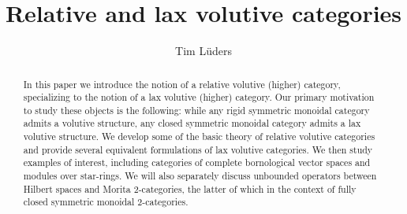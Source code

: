 \documentclass{article}
\title{Relative and lax volutive categories}
\author{Tim Lüders}
\date{}
\numberwithin{equation}{section}
\theoremstyle{definition}
\theoremstyle{theorem}
\begin{document}
\maketitle
\begin{abstract}
    In this paper we introduce the notion of a relative volutive (higher) category, specializing to the notion of 
    a lax volutive (higher) category. Our primary motivation to study these objects is the following: while any 
    rigid symmetric monoidal category admits a volutive structure, any closed symmetric monoidal category admits 
    a lax volutive structure. We develop some of the basic theory of relative volutive categories and provide 
    several equivalent formulations of lax volutive categories. We then study examples of interest, including 
    categories of complete bornological vector spaces and modules over star-rings. We will also separately 
    discuss unbounded operators between Hilbert spaces and Morita 2-categories, the latter of which in the context of 
    fully closed symmetric monoidal 2-categories.
\end{abstract}

\tableofcontents
\end{document}
